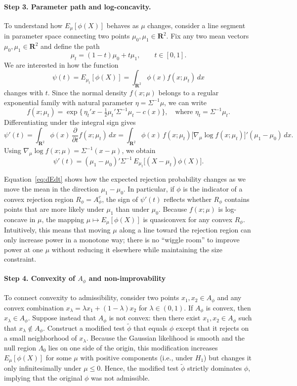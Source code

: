 \documentclass[12pt]{article}
\begin{document}
\paragraph{Step 3. Parameter path and log-concavity.} To understand how $E_\mu[\phi(X)]$ behaves as $\mu$ changes, consider a line segment in parameter space connecting two points $\mu_0, \mu_1 \in \mathbf{R}^2$. Fix any two mean vectors $\mu_0, \mu_1 \in \mathbf{R}^2$ and define the
path
\[
\mu_t = (1-t)\mu_0 + t \mu_1, \qquad t \in [0,1].
\]
We are interested in how the function
\[
\psi(t) = E_{\mu_t}[\phi(X)] = \int_{\mathbf{R}^2} \phi(x) f(x;\mu_t)\,dx
\]
changes with $t$.  Since the normal density $f(x;\mu)$ belongs to a
regular exponential family with natural parameter
$\eta = \Sigma^{-1}\mu$, we can write
\[
f(x;\mu_t) = \exp\!\Big\{\,\eta_t'x - \tfrac{1}{2}\mu_t'\Sigma^{-1}\mu_t - c(x)\Big\},
\quad \text{where } \eta_t = \Sigma^{-1}\mu_t.
\]
Differentiating under the integral sign gives
\[
\psi'(t) = \int_{\mathbf{R}^2}\phi(x)\,
\frac{\partial}{\partial t} f(x;\mu_t)\,dx
= \int_{\mathbf{R}^2}\phi(x)\, f(x;\mu_t)
\big[\nabla_\mu \log f(x;\mu_t)\big]'(\mu_1-\mu_0)\,dx.
\]
Using $\nabla_\mu \log f(x;\mu) = \Sigma^{-1}(x-\mu)$, we obtain
\begin{equation}\label{eq:dEdt}
\psi'(t)
= (\mu_1-\mu_0)'\Sigma^{-1}\,
E_{\mu_t}\!\big[(X-\mu_t)\phi(X)\big].
\end{equation}

Equation~\eqref{eq:dEdt} shows how the expected rejection probability changes as we move the mean in the direction $\mu_1-\mu_0$.
In particular, if $\phi$ is the indicator of a convex rejection region $R_\phi = A_\phi^c$, the sign of $\psi'(t)$ reflects whether $R_\phi$ contains points that are more likely under $\mu_1$ than under $\mu_0$. Because $f(x;\mu)$ is log-concave in $\mu$, the mapping $\mu\mapsto E_\mu[\phi(X)]$ is quasiconvex for any convex $R_\phi$. Intuitively, this means that moving $\mu$ along a line toward the rejection region can only increase power in a monotone way; there is no “wiggle room” to improve power at one $\mu$ without reducing it elsewhere while maintaining the size constraint.

\paragraph{Step 4. Convexity of $A_\phi$ and non-improvability}

To connect convexity to admissibility, consider two points $x_1, x_2 \in A_\phi$ and any convex combination $x_\lambda = \lambda x_1 + (1-\lambda)x_2$ for $\lambda \in (0,1)$.  If $A_\phi$ is convex, then $x_\lambda \in A_\phi$.  Suppose instead that $A_\phi$ is not convex: then there exist $x_1, x_2 \in A_\phi$ such that $x_\lambda \notin A_\phi$.  Construct a modified test $\tilde\phi$ that equals $\phi$ except that it rejects on a small neighborhood of $x_\lambda$.  Because the Gaussian likelihood is smooth and the null region $\Lambda_0$ lies on one side of the origin, this modification increases $E_\mu[\phi(X)]$ for some $\mu$ with positive components (i.e., under $H_1$) but changes it only infinitesimally under $\mu \le 0$.  Hence, the modified test $\tilde\phi$ strictly dominates $\phi$, implying that the original $\phi$ was not admissible.
\end{document}
